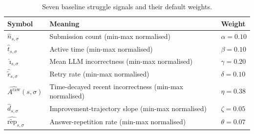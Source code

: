 \begin{table}[H]
    \centering
    \begin{tabular}{|p{}|p{}|p{}|}
    \hline
    \textbf{Symbol} & \textbf{Meaning} & \textbf{Weight} \\
    \hline
    $\hat{n}_{s,\sigma}$ & Submission count (min-max normalised) & $\alpha = 0.10$ \\
    \hline
    $\hat{t}_{s,\sigma}$ & Active time (min-max normalised) & $\beta = 0.10$ \\
    \hline
    $\hat{\imath}_{s,\sigma}$ & Mean LLM incorrectness (min-max normalised) & $\gamma = 0.20$ \\
    \hline
    $\hat{\tilde{r}}_{s,\sigma}$ & Retry rate (min-max normalised) & $\delta = 0.10$ \\
    \hline
    $\widehat{A^{\mathrm{raw}}}(s,\sigma)$ & Time-decayed recent incorrectness (min-max normalised) & $\eta = 0.38$ \\
    \hline
    $\hat{d}_{s,\sigma}$ & Improvement-trajectory slope (min-max normalised) & $\zeta = 0.05$ \\
    \hline
    $\widehat{\tilde{\mathrm{rep}}}_{s,\sigma}$ & Answer-repetition rate (min-max normalised) & $\theta = 0.07$ \\
    \hline
    \end{tabular}
    \caption{Seven baseline struggle signals and their default weights.}
    \label{tab: struggle weights}
\end{table}

